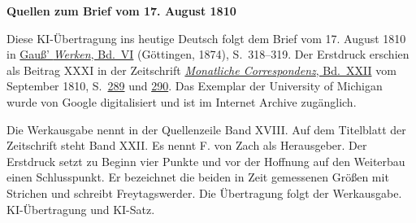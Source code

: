 \clearpage\thispagestyle{empty}
\begin{center}\textbf{Quellen zum Brief vom 17. August 1810}\end{center}
\noindent Diese KI-Übertragung ins heutige Deutsch folgt dem Brief vom 17. August 1810 in \href{https://gdz.sub.uni-goettingen.de/id/PPN236007467}{Gauß’ \textit{Werken}, Bd.~VI} (Göttingen, 1874), S.~318--319. Der Erstdruck erschien als Beitrag XXXI in der Zeitschrift \href{https://archive.org/download/bub_gb_YCI4AAAAMAAJ/page/n4.jpg}{\textit{Monatliche Correspondenz}, Bd.~XXII} vom September 1810, S.~\href{https://archive.org/download/bub_gb_YCI4AAAAMAAJ/page/n292.jpg}{289} und \href{https://archive.org/download/bub_gb_YCI4AAAAMAAJ/page/n293.jpg}{290}. Das Exemplar der University of Michigan wurde von Google digitalisiert und ist im Internet Archive zugänglich.
\par\smallskip\noindent Die Werkausgabe nennt in der Quellenzeile Band XVIII. Auf dem Titelblatt der Zeitschrift steht Band XXII. Es nennt F. von Zach als Herausgeber. Der Erstdruck setzt zu Beginn vier Punkte und vor der Hoffnung auf den Weiterbau einen Schlusspunkt. Er bezeichnet die beiden in Zeit gemessenen Größen mit Strichen und schreibt Freytagswerder. Die Übertragung folgt der Werkausgabe. KI-Übertragung und KI-Satz.
\clearpage
